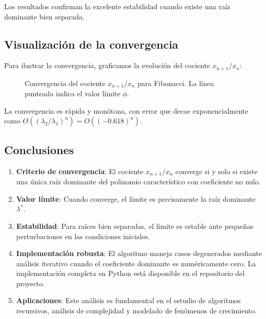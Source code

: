 \documentclass[12pt]{article}
\begin{document}
Los resultados confirman la excelente estabilidad cuando existe una raíz dominante bien separada.

\subsection{Visualización de la convergencia}

Para ilustrar la convergencia, graficamos la evolución del cociente $x_{n+1}/x_n$:

\begin{figure}[h]
\centering
\caption{Convergencia del cociente $x_{n+1}/x_n$ para Fibonacci. La línea punteada indica el valor límite $\phi$.}
\end{figure}

La convergencia es rápida y monótona, con error que decae exponencialmente como $O((\lambda_2/\lambda_1)^n) = O((-0.618)^n)$.

\subsection{Conclusiones}

\begin{enumerate}
    \item \textbf{Criterio de convergencia}: El cociente $x_{n+1}/x_n$ converge si y solo si existe una única raíz dominante del polinomio característico con coeficiente no nulo.
    
    \item \textbf{Valor límite}: Cuando converge, el límite es precisamente la raíz dominante $\lambda^*$.
    
    \item \textbf{Estabilidad}: Para raíces bien separadas, el límite es estable ante pequeñas perturbaciones en las condiciones iniciales.
    
    \item \textbf{Implementación robusta}: El algoritmo maneja casos degenerados mediante análisis iterativo cuando el coeficiente dominante es numéricamente cero. La implementación completa en Python está disponible en el repositorio del proyecto.
    
    \item \textbf{Aplicaciones}: Este análisis es fundamental en el estudio de algoritmos recursivos, análisis de complejidad y modelado de fenómenos de crecimiento.
\end{enumerate}
\end{document}
